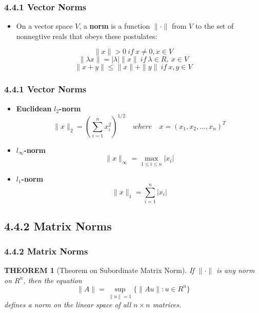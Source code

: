 \documentclass[notheorems,mathserif,table,compress]{beamer}  %
\begin{document}
\begin{frame}
  \frametitle{4.4.1 Vector Norms}
  \begin{itemize}
  \item On a vector space $V$, a \textbf{norm} is a function $\parallel\cdot\parallel$ from $V$ to the set of nonnegtive reals that obeys these postulates:
  \end{itemize}
  \begin{equation}
  \parallel x\parallel>0 \ if \ x\ne0, x\in V
  \end{equation}
  \begin{equation}
  \parallel\lambda x\parallel=|\lambda|\parallel x\parallel \ if \ \lambda \in R, \ x\in V
  \end{equation}
  \begin{equation}
  \parallel x+y\parallel \le \parallel x\parallel+\parallel y\parallel \ if \ x,y\in V
  \end{equation}
\end{frame}


\begin{frame}
  \frametitle{4.4.1 Vector Norms}
  \begin{itemize}
  \item \textbf{Euclidean} $l_2$\textbf{-norm} 
  \[ \parallel x\parallel_2=\left(\sum_{i=1}^n x_i^2\right)^{1/2} \quad where \quad x=(x_1,x_2,\dots,x_n)^T \]
  \item $l_\infty$\textbf{-norm}
  \[ \parallel x\parallel_\infty=\max_{1\le i\le n} |x_i| \]
  \item $l_1$\textbf{-norm}
  \[ \parallel x\parallel_1=\sum_{i=1}^n |x_i| \]
  \end{itemize}
\end{frame}


\subsection{4.4.2 Matrix Norms}


\begin{frame}
  \frametitle{4.4.2 Matrix Norms}
  \newtheorem{theorem1}{THEOREM}
  \begin{theorem1}[Theorem on Subordinate Matrix Norm]
  If $\parallel\cdot\parallel$ is any norm on $R^n$, then the equation
  \[ \parallel A\parallel=\sup_{\parallel u\parallel=1} \{\parallel Au\parallel:u\in R^n\} \]
  defines a norm on the linear space of all $n\times n$ matrices.
  \end{theorem1}
\end{frame}
\end{document}
